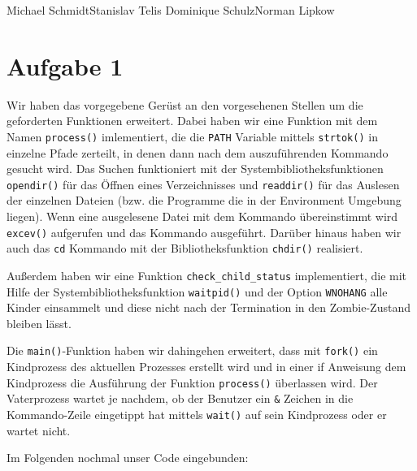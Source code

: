 \documentclass{ti2}
\begin{document}
%
                {Michael Schmidt}{Stanislav Telis}%
                {Dominique Schulz}{Norman Lipkow}%
                  

\section*{Aufgabe 1}
Wir haben das vorgegebene Gerüst an den vorgesehenen Stellen um die geforderten Funktionen erweitert. Dabei haben wir eine Funktion mit dem Namen \texttt{process()} imlementiert, die die \texttt{PATH} Variable mittels \texttt{strtok()} in einzelne Pfade zerteilt, in denen dann nach dem auszuführenden Kommando gesucht wird. Das Suchen funktioniert mit der Systembibliotheksfunktionen \texttt{opendir()} für das Öffnen eines Verzeichnisses und \texttt{readdir()} für das Auslesen der einzelnen Dateien (bzw. die Programme die in der Environment Umgebung liegen). Wenn eine ausgelesene Datei mit dem Kommando übereinstimmt wird \texttt{excev()} aufgerufen und das Kommando ausgeführt. Darüber hinaus haben wir auch das \texttt{cd} Kommando mit der Bibliotheksfunktion \texttt{chdir()} realisiert.

Außerdem haben wir eine Funktion \texttt{check\_child\_status} implementiert, die mit Hilfe der Systembibliotheksfunktion \texttt{waitpid()} und der Option \texttt{WNOHANG} alle Kinder einsammelt und diese nicht nach der Termination in den Zombie-Zustand bleiben lässt.

Die \texttt{main()}-Funktion haben wir dahingehen erweitert, dass mit \texttt{fork()} ein Kindprozess des aktuellen Prozesses erstellt wird und in einer if Anweisung dem Kindprozess die Ausführung der Funktion \texttt{process()} überlassen wird. Der Vaterprozess wartet je nachdem, ob der Benutzer ein \texttt{\&} Zeichen in die Kommando-Zeile eingetippt hat mittels \texttt{wait()} auf sein Kindprozess oder er wartet nicht.

Im Folgenden nochmal unser Code eingebunden:
\end{document}
